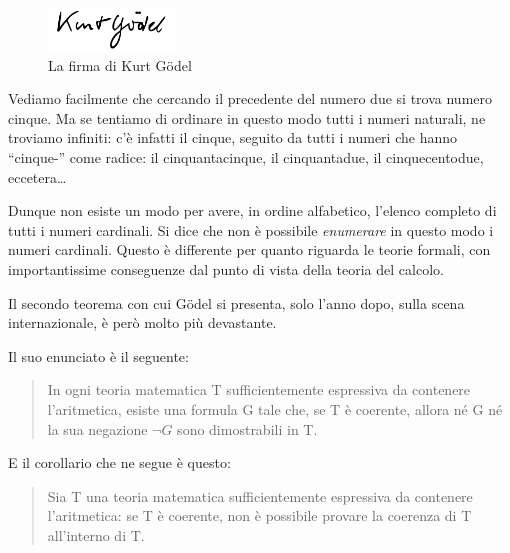 \documentclass[a4paper,10pt]{article}
\begin{document}
\begin{figure}[b!]
 \centering
 \includegraphics[width=128]{./pics/128px-KG_signature.png}
 \caption{La firma di Kurt Gödel}
\end{figure}

Vediamo facilmente che cercando il precedente del numero due si trova numero cinque. Ma se tentiamo di ordinare in questo modo tutti i numeri naturali, ne troviamo infiniti: c'è infatti il cinque, seguito da tutti i numeri che hanno “cinque-” come radice: il cinquantacinque, il cinquantadue, il cinquecentodue, eccetera\dots

Dunque non esiste un modo per avere, in ordine alfabetico, l'elenco completo di tutti i numeri cardinali. Si dice che non è possibile \textit{enumerare} in questo modo i numeri cardinali. Questo è differente per quanto riguarda le teorie formali, con importantissime conseguenze dal punto di vista della teoria del calcolo.

Il secondo teorema con cui Gödel si presenta, solo l'anno dopo, sulla scena internazionale, è però molto più devastante.

Il suo enunciato è il seguente:

\begin{quote}
  In ogni teoria matematica T sufficientemente espressiva da contenere l'aritmetica, esiste una formula G tale che, se T è coerente, allora né G né la sua negazione $\neg G$ sono dimostrabili in T.
\end{quote} 

E il corollario che ne segue è questo:
\begin{quotation}
  Sia T una teoria matematica sufficientemente espressiva da contenere l'aritmetica: se T è coerente, non è possibile provare la coerenza di T all'interno di T.
\end{quotation}
\end{document}
